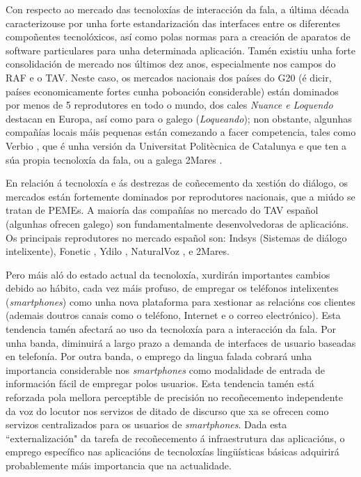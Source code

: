 \begin{multicols}{2}
Con respecto ao mercado das tecnoloxías de interacción da fala, a última década caracterizouse por unha forte estandarización das interfaces entre os diferentes compoñentes tecnolóxicos, así como polas normas para a creación de aparatos de software particulares para unha determinada aplicación. Tamén existiu unha forte consolidación de mercado nos últimos dez anos, especialmente nos campos do RAF e o TAV. Neste caso, os mercados nacionais dos países do G20 (é dicir, países economicamente fortes cunha poboación considerable) están dominados por menos de 5 reprodutores en todo o mundo, dos cales \textit{Nuance e Loquendo} destacan en Europa, así como para o galego (\textit{Loqueando}); non obstante, algunhas compañías locais máis pequenas están comezando a facer competencia, tales como Verbio \cite{GAL-Nota25} , que é unha versión da Universitat Politècnica de Catalunya e que ten a súa propia tecnoloxía da fala, ou a galega 2Mares \cite{GAL-Nota26}.

En relación á tecnoloxía e ás destrezas de coñecemento da xestión do diálogo, os mercados están fortemente dominados por reprodutores nacionais, que a miúdo se tratan de PEMEs.
A maioría das compañías no mercado do TAV español (algunhas ofrecen galego) son fundamentalmente desenvolvedoras de aplicacións. Os principais reprodutores no mercado español son: Indsys \cite{GAL-Nota27} (Sistemas de diálogo intelixente), Fonetic \cite{GAL-Nota28}, Ydilo \cite{GAL-Nota29}, NaturalVoz \cite{GAL-Nota30}, e 2Mares.

Pero máis aló do estado actual da tecnoloxía, xurdirán importantes cambios debido ao hábito, cada vez máis profuso, de empregar os teléfonos intelixentes (\textit{smartphones}) como unha nova plataforma para xestionar as relacións cos clientes (ademais doutros canais como o teléfono, Internet e o correo electrónico). Esta tendencia tamén afectará ao uso da tecnoloxía para a interacción da fala. Por unha banda, diminuirá a largo prazo a demanda de interfaces de usuario baseadas en telefonía. Por outra banda, o emprego da lingua falada cobrará unha importancia considerable nos \textit{smartphones} como modalidade de entrada de información fácil de empregar polos usuarios. Esta tendencia tamén está reforzada pola mellora perceptible de precisión no recoñecemento independente da voz do locutor nos servizos de ditado de discurso que xa se ofrecen como servizos centralizados para os usuarios de \textit{smartphones}. Dada esta “externalización" da tarefa de recoñecemento á infraestrutura das aplicacións, o emprego específico nas aplicacións de tecnoloxías lingüísticas básicas adquirirá probablemente máis importancia que na actualidade. 


\end{multicols}
